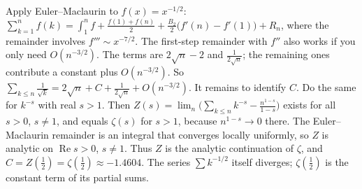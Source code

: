 \documentclass[11pt,a4paper]{article}
\begin{document}
 Apply Euler--Maclaurin to $f(x)=x^{-1/2}$: $\sum_{k=1}^nf(k)=\int_1^nf+\frac{f(1)+f(n)}2+\frac{B_2}{2}\bigl(f'(n)-f'(1)\bigr)+R_n$, where the remainder involves $f'''\sim x^{-7/2}$. The first-step remainder with $f''$ also works if you only need $O(n^{-3/2})$.
 The terms are $2\sqrt n-2$ and $\frac1{2\sqrt n}$; the remaining ones contribute a constant plus $O(n^{-3/2})$. So $\sum_{k\le n}\frac1{\sqrt k}=2\sqrt n+C+\frac1{2\sqrt n}+O(n^{-3/2})$. It remains to identify $C$.
 Do the same for $k^{-s}$ with real $s>1$. Then $Z(s)=\lim_n\bigl(\sum_{k\le n}k^{-s}-\frac{n^{1-s}}{1-s}\bigr)$ exists for all $s>0$, $s\ne1$, and equals $\zeta(s)$ for $s>1$, because $n^{1-s}\to0$ there. The Euler--Maclaurin remainder is an integral that converges locally uniformly, so $Z$ is analytic on $\operatorname{Re}s>0$, $s\ne1$. Thus $Z$ is the analytic continuation of $\zeta$, and $C=Z(\frac12)=\zeta(\frac12)\approx-1.4604$. The series $\sum k^{-1/2}$ itself diverges; $\zeta(\frac12)$ is the constant term of its partial sums.
\end{document}
